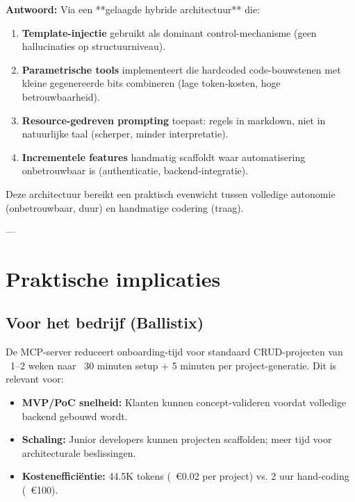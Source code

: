 \noindent
\textbf{Antwoord:} Via een **gelaagde hybride architectuur** die:

\begin{enumerate}
  \item \textbf{Template-injectie} gebruikt als dominant control-mechanisme (geen hallucinaties op structuurniveau).
  
  \item \textbf{Parametrische tools} implementeert die hardcoded code-bouwstenen met kleine gegenereerde bits combineren (lage token-kosten, hoge betrouwbaarheid).
  
  \item \textbf{Resource-gedreven prompting} toepast: regels in markdown, niet in natuurlijke taal (scherper, minder interpretatie).
  
  \item \textbf{Incrementele features} handmatig scaffoldt waar automatisering onbetrouwbaar is (authenticatie, backend-integratie).
\end{enumerate}

Deze architectuur bereikt een praktisch evenwicht tussen volledige autonomie (onbetrouwbaar, duur) en handmatige codering (traag).

---

\section{Praktische implicaties}

\subsection{Voor het bedrijf (Ballistix)}

De MCP-server reduceert onboarding-tijd voor standaard CRUD-projecten van ~1–2 weken naar ~30 minuten setup + 5 minuten per project-generatie. Dit is relevant voor:

\begin{itemize}
  \item \textbf{MVP/PoC snelheid:} Klanten kunnen concept-valideren voordat volledige backend gebouwd wordt.
  
  \item \textbf{Schaling:} Junior developers kunnen projecten scaffolden; meer tijd voor architecturale beslissingen.
  
  \item \textbf{Kostenefficiëntie:} 44.5K tokens (~€0.02 per project) vs. 2 uur hand-coding (~€100).
\end{itemize}

